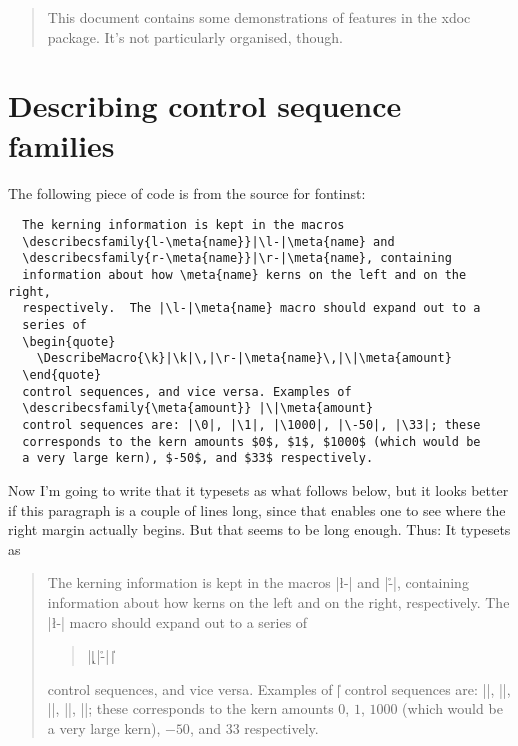 \documentclass[twoside]{ltxdoc}
\DeclareRobustCommand\package[1]{\textsf{#1}}
\begin{document}
\begin{abstract}
  This document contains some demonstrations of features in the 
  \package{xdoc} package. It's not particularly organised, though.
\end{abstract}

\section{Describing control sequence families}

The following piece of code is from the source for \package{fontinst}:
\begin{verbatim}
  The kerning information is kept in the macros 
  \describecsfamily{l-\meta{name}}|\l-|\meta{name} and
  \describecsfamily{r-\meta{name}}|\r-|\meta{name}, containing 
  information about how \meta{name} kerns on the left and on the right, 
  respectively.  The |\l-|\meta{name} macro should expand out to a 
  series of 
  \begin{quote}
    \DescribeMacro{\k}|\k|\,|\r-|\meta{name}\,|\|\meta{amount}
  \end{quote}
  control sequences, and vice versa. Examples of  
  \describecsfamily{\meta{amount}} |\|\meta{amount}
  control sequences are: |\0|, |\1|, |\1000|, |\-50|, |\33|; these 
  corresponds to the kern amounts $0$, $1$, $1000$ (which would be 
  a very large kern), $-50$, and $33$ respectively.
\end{verbatim}
Now I'm going to write that it typesets as what follows below, but it 
looks better if this paragraph is a couple of lines long, since that 
enables one to see where the right margin actually begins. But that 
seems to be long enough. Thus:
It typesets as
\begin{quote}
  The kerning information is kept in the macros 
  |\l-| and
  |\r-|, containing 
  information about how  kerns on the left and on the right, 
  respectively.  The |\l-| macro should expand out to a 
  series of 
  \begin{quote}
    \DescribeMacro{\k}|\k|\,|\r-|\,|\|
  \end{quote}
  control sequences, and vice versa. Examples of  
   |\|
  control sequences are: |\0|, |\1|, ||, ||, ||; these 
  corresponds to the kern amounts $0$, $1$, $1000$ (which would be 
  a very large kern), $-50$, and $33$ respectively.
\end{quote}
\end{document}

